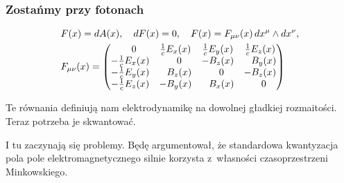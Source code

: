 \documentclass[10pt,t]{beamer}
\begin{document}
\begin{frame}
  \frametitle{Zostańmy przy fotonach}


  \begin{subequations}
    \begin{align}
      \label{eq:Czemu-rozwazanie-02-A}
      &F( x ) = dA( x ), \quad dF( x ) = 0, \quad
        F( x ) = F_{ \mu \nu }( x ) \, dx^{ \mu } \wedge dx^{ \nu }, \\
      \label{eq:Czemu-rozwazanie-02-B}
      &F_{ \mu \nu }( x )
        =
        \begin{pmatrix}
          \hphantom{-} 0
          & \frac{ 1 }{ c } E_{ x }( x ) & \frac{ 1 }{ c } E_{ y }( x )
          & \frac{ 1 }{ c } E_{ z }( x ) \\
          -\frac{ 1 }{ c } E_{ x }( x )
          & \hphantom{-} 0 & -B_{ z }( x ) & \hphantom{-} B_{ y }( x ) \\
          -\frac{ 1 }{ c } E_{ y }( x )
          & \hphantom{-} B_{ z }( x ) & \hphantom{-} 0 & -B_{ z }( x ) \\
          -\frac{ 1 }{ c } E_{ z }( x )
          & -B_{ y }( x ) & \hphantom{-} B_{ x }( x ) & \hphantom{-} 0
        \end{pmatrix}
    \end{align}
  \end{subequations}

  Te równania definiują nam elektrodynamikę na dowolnej gładkiej
  rozmaitości. Teraz potrzeba je skwantować.

  I tu zaczynają się problemy. Będę argumentował, że standardowa
  kwantyzacja pola pole elektromagnetycznego silnie korzysta
  z~własności czasoprzestrzeni Minkowskiego.

\end{frame}
\end{document}
